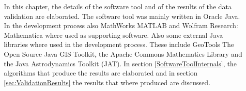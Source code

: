 In this chapter, the details of the software tool and of the results of the data validation are elaborated. The software tool was mainly written in Oracle Java. In the development process also MathWorks MATLAB and Wolfram Research: Mathematica where used as supporting software. Also some external Java libraries where used in the development process. These include GeoTools The Open Source Java GIS Toolkit, the Apache Commons Mathematics Library and the Java Astrodynamics Toolkit (JAT). In section \ref{SoftwareToolInternals}, the algorithms that produce the results are elaborated and in section \ref{sec:ValidationResults} the results that where produced are discussed.
